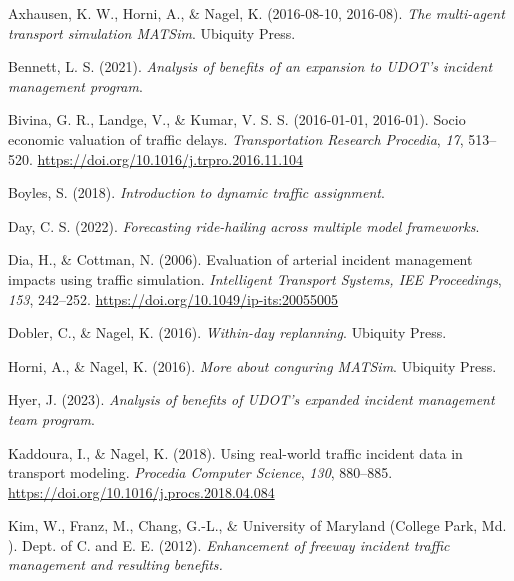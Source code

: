 \documentclass[fancy, oneside, mastersfancy, ms]{byuthesis}
\newlength{\cslhangindent}
\newlength{\cslentryspacingunit} %
\newenvironment{CSLReferences}[2] %
 {%
  \setlength{\parindent}{0pt}
  \ifodd #1
  \let\oldpar\par
  \def\par{\hangindent=\cslhangindent\oldpar}
  \fi
  \setlength{\parskip}{#2\cslentryspacingunit}
 }%
 {}
\begin{document}
\hypertarget{refs}{}
\begin{CSLReferences}{1}{0}
\leavevmode{}%
Axhausen, K. W., Horni, A., \& Nagel, K. (2016-08-10, 2016-08).
\emph{The multi-agent transport simulation {MATSim}}. {Ubiquity Press}.

\leavevmode{}%
Bennett, L. S. (2021). \emph{Analysis of benefits of an expansion to
UDOT's incident management program}.

\leavevmode{}%
Bivina, G. R., Landge, V., \& Kumar, V. S. S. (2016-01-01, 2016-01).
Socio economic valuation of traffic delays. \emph{Transportation
Research Procedia}, \emph{17}, 513--520.
\url{https://doi.org/10.1016/j.trpro.2016.11.104}

\leavevmode{}%
Boyles, S. (2018). \emph{Introduction to dynamic traffic assignment}.

\leavevmode{}%
Day, C. S. (2022). \emph{Forecasting ride-hailing across multiple model
frameworks}.

\leavevmode{}%
Dia, H., \& Cottman, N. (2006). Evaluation of arterial incident
management impacts using traffic simulation. \emph{Intelligent Transport
Systems, IEE Proceedings}, \emph{153}, 242--252.
\url{https://doi.org/10.1049/ip-its:20055005}

\leavevmode{}%
Dobler, C., \& Nagel, K. (2016). \emph{Within-day replanning}. {Ubiquity
Press}.

\leavevmode{}%
Horni, A., \& Nagel, K. (2016). \emph{More about conguring MATSim}.
{Ubiquity Press}.

\leavevmode{}%
Hyer, J. (2023). \emph{Analysis of benefits of UDOT's expanded incident
management team program}.

\leavevmode{}%
Kaddoura, I., \& Nagel, K. (2018). Using real-world traffic incident
data in transport modeling. \emph{Procedia Computer Science},
\emph{130}, 880--885. \url{https://doi.org/10.1016/j.procs.2018.04.084}

\leavevmode{}%
Kim, W., Franz, M., Chang, G.-L., \& University of Maryland (College
Park, Md. ). Dept. of C. and E. E. (2012). \emph{Enhancement of freeway
incident traffic management and resulting benefits.}


\end{CSLReferences}
\end{document}
